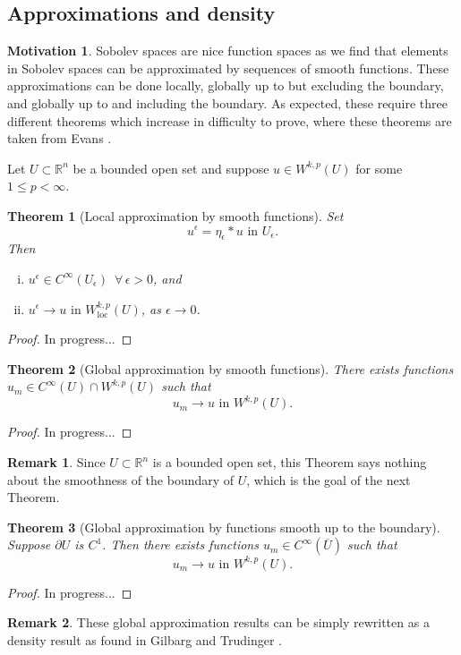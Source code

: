 \documentclass[11pt]{article}
\newtheorem{theorem}{Theorem}
\theoremstyle{definition}
\newtheorem*{remark}{Remark}
\newtheorem*{motivation}{Motivation}
\begin{document}
\subsection{Approximations and density}
\begin{motivation}
Sobolev spaces are nice function spaces as we find that elements in Sobolev spaces can be approximated by sequences of smooth functions.
These approximations can be done locally, globally up to but excluding the boundary, and globally up to and including the boundary.
As expected, these require three different theorems which increase in difficulty to prove, where these theorems are taken from Evans \cite{evans1998partial}.
\end{motivation}
Let $U \subset \mathbb{R}^n$ be a bounded open set and suppose $u \in W^{k,p}(U)$ for some $1 \leq p < \infty$.
\begin{theorem}[Local approximation by smooth functions]
Set
	\[u^{\epsilon} = \eta_{\epsilon} * u \text{ in } U_{\epsilon}.\]
Then
	\begin{enumerate}[(i)]
		\item $u^{\epsilon} \in C^{\infty}(U_{\epsilon}) \,\,\, \forall \, \epsilon > 0$, and
		\item $u^{\epsilon} \rightarrow u \text{ in } W_{\text{loc}}^{k,p}(U)$, as $\epsilon \rightarrow 0$.
	\end{enumerate}
\end{theorem}
\begin{proof}
In progress...
\end{proof}

\begin{theorem}[Global approximation by smooth functions]
	There exists functions $u_m \in C^{\infty}(U)\cap W^{k,p}(U)$ such that
	\[u_m \rightarrow u \text{ in } W^{k,p}(U).\]
\end{theorem}
\begin{proof}
In progress...
\end{proof}

\begin{remark}
Since $U \subset \mathbb{R}^n$ is a bounded open set, this Theorem says
nothing about the smoothness of the boundary of $U$, which is the goal of the next Theorem.
\end{remark}

\begin{theorem}[Global approximation by functions smooth up to the boundary]
	Suppose $\partial U$ is $C^1$.
	Then there exists functions $u_m \in C^{\infty}(\overline{U})$ such that
	\[u_m \rightarrow u \text{ in } W^{k,p}(U).\]
\end{theorem}
\begin{proof}
In progress...
\end{proof}
\begin{remark}
	These global approximation results can be simply rewritten as a density result
	as found in Gilbarg and Trudinger \cite{gilbarg2001elliptic}.
\end{remark}
\end{document}
